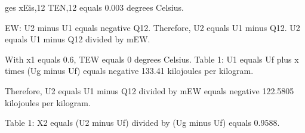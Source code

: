 ges xEis,12  
TEN,12 equals 0.003 degrees Celsius.  

EW:  
U2 minus U1 equals negative Q12.  
Therefore, U2 equals U1 minus Q12.  
U2 equals U1 minus Q12 divided by mEW.  

With x1 equals 0.6, TEW equals 0 degrees Celsius.  
Table 1:  
U1 equals Uf plus x times (Ug minus Uf) equals negative 133.41 kilojoules per kilogram.  

Therefore, U2 equals U1 minus Q12 divided by mEW equals negative 122.5805 kilojoules per kilogram.  

Table 1:  
X2 equals (U2 minus Uf) divided by (Ug minus Uf) equals 0.9588.